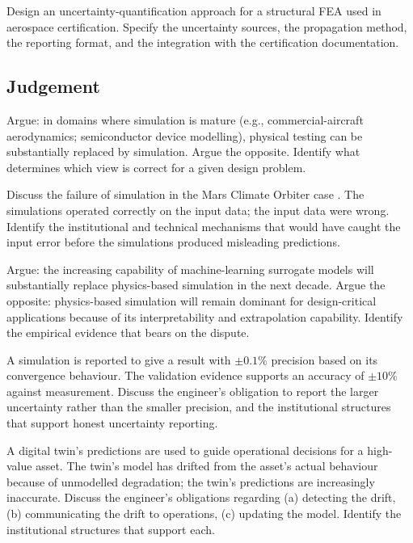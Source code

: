 \begin{exercise}
Design an uncertainty-quantification approach for a structural FEA used in aerospace certification. Specify the uncertainty sources, the propagation method, the reporting format, and the integration with the certification documentation.
\end{exercise}

\subsection*{Judgement}

\begin{exercise}
Argue: in domains where simulation is mature (e.g., commercial-aircraft aerodynamics; semiconductor device modelling), physical testing can be substantially replaced by simulation. Argue the opposite. Identify what determines which view is correct for a given design problem.
\end{exercise}

\begin{exercise}
Discuss the failure of simulation in the Mars Climate Orbiter case \cite{acc:nasa-mco-mib}. The simulations operated correctly on the input data; the input data were wrong. Identify the institutional and technical mechanisms that would have caught the input error before the simulations produced misleading predictions.
\end{exercise}

\begin{exercise}
Argue: the increasing capability of machine-learning surrogate models will substantially replace physics-based simulation in the next decade. Argue the opposite: physics-based simulation will remain dominant for design-critical applications because of its interpretability and extrapolation capability. Identify the empirical evidence that bears on the dispute.
\end{exercise}

\begin{exercise}
A simulation is reported to give a result with $\pm 0.1\%$ precision based on its convergence behaviour. The validation evidence supports an accuracy of $\pm 10\%$ against measurement. Discuss the engineer's obligation to report the larger uncertainty rather than the smaller precision, and the institutional structures that support honest uncertainty reporting.
\end{exercise}

\begin{exercise}
A digital twin's predictions are used to guide operational decisions for a high-value asset. The twin's model has drifted from the asset's actual behaviour because of unmodelled degradation; the twin's predictions are increasingly inaccurate. Discuss the engineer's obligations regarding (a) detecting the drift, (b) communicating the drift to operations, (c) updating the model. Identify the institutional structures that support each.
\end{exercise}

